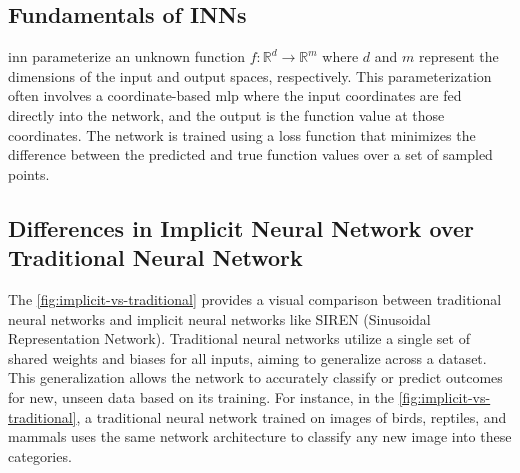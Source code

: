 \documentclass{ioereport}
\begin{document}
    \subsection{Fundamentals of INNs}
    \gls{inn} parameterize an unknown function \( f: \mathbb{R}^d \rightarrow \mathbb{R}^m \) where \( d \) and \( m \) represent the dimensions of the input and output spaces, respectively. This parameterization often involves a coordinate-based \gls{mlp} where the input coordinates are fed directly into the network, and the output is the function value at those coordinates. The network is trained using a loss function that minimizes the difference between the predicted and true function values over a set of sampled points.

    \subsection{Differences in Implicit Neural Network over Traditional Neural Network}

    The \autoref{fig:implicit-vs-traditional} provides a visual comparison between traditional neural networks and implicit neural networks like SIREN (Sinusoidal Representation Network). Traditional neural networks utilize a single set of shared weights and biases for all inputs, aiming to generalize across a dataset. This generalization allows the network to accurately classify or predict outcomes for new, unseen data based on its training. For instance, in the \autoref{fig:implicit-vs-traditional}, a traditional neural network trained on images of birds, reptiles, and mammals uses the same network architecture to classify any new image into these categories.
\end{document}
